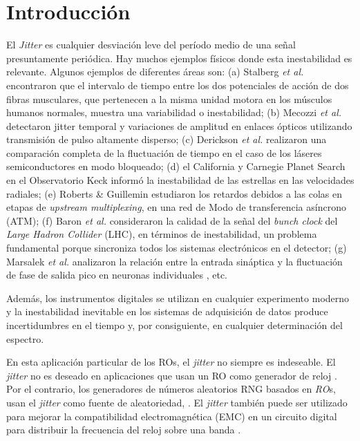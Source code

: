\section{Introducción}
\label{sec:intro}

El \emph{Jitter} es cualquier desviación leve del período medio de una señal presuntamente periódica.
Hay muchos ejemplos físicos donde esta inestabilidad es relevante.
Algunos ejemplos de diferentes áreas son:
(a) Stalberg \textit{et al.} \cite{Stalberg1971} encontraron que el intervalo de tiempo entre los dos potenciales de acción de dos fibras musculares, que pertenecen a la misma unidad motora en los músculos humanos normales, muestra una variabilidad o inestabilidad;
(b) Mecozzi \textit{et al.} \cite{Mecozzi2001} detectaron jitter temporal y variaciones de amplitud en enlaces ópticos utilizando transmisión de pulso altamente disperso;
(c) Derickson \textit{et al.} \cite{Derickson1991} realizaron una comparación completa de la fluctuación de tiempo en el caso de los láseres semiconductores en modo bloqueado;
(d) el California y Carnegie Planet Search en el Observatorio Keck \cite{Wright2005} informó la inestabilidad de las estrellas en las velocidades radiales;
(e) Roberts \& Guillemin estudiaron los retardos debidos a las colas en etapas de \textit{upstream multiplexing}, en una red de Modo de transferencia asíncrono (ATM);
(f) Baron \textit{et al.} \cite{Baron2012} consideraron la calidad de la señal del \textit{bunch clock} del \textit{Large Hadron Collider} (LHC), en términos de inestabilidad, un problema fundamental porque sincroniza todos los sistemas electrónicos en el detector;
(g) Marsalek \textit{et al.} analizaron la relación entre la entrada sináptica y la fluctuación de fase de salida pico en neuronas individuales \cite{Marsalek1997}, etc.

Además, los instrumentos digitales se utilizan en cualquier experimento moderno y la inestabilidad inevitable en los sistemas de adquisición de datos produce incertidumbres en el tiempo y, por consiguiente, en cualquier determinación del espectro.

En esta aplicación particular de los ROs, el \textit{jitter} no siempre es indeseable.
El \textit{jitter} no es deseado en aplicaciones que usan un RO como generador de reloj \cite{Buedo1998, Beomsup1990, Hajimiri1999, Mandal2010, Gupta2011}.
Por el contrario, los generadores de números aleatorios RNG basados en \emph{RO}s, usan el \textit{jitter} como fuente de aleatoriedad, \cite{Sunar2007, Wold2009}.
El \textit{jitter} también puede ser utilizado para mejorar la compatibilidad electromagnética (EMC) en un circuito digital para distribuir la frecuencia del reloj sobre una banda \cite{DeMicco2012}.

